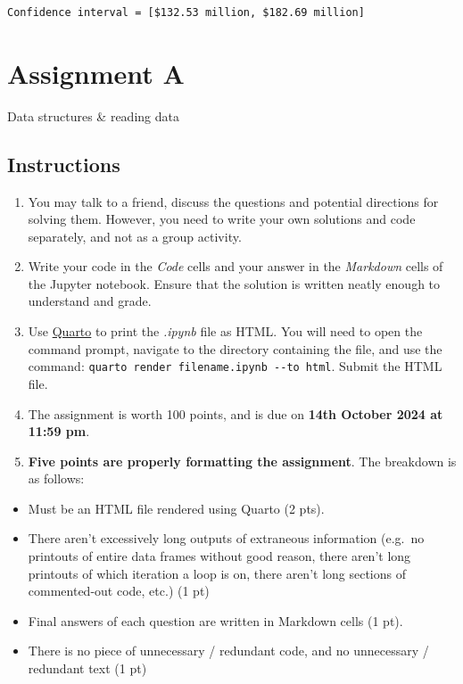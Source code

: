 \documentclass[
  letterpaper,
  DIV=11,
  numbers=noendperiod]{scrreprt}
\providecommand{\tightlist}{%
  \setlength{\itemsep}{0pt}\setlength{\parskip}{0pt}}\usepackage{longtable,booktabs,array}
\begin{document}
\begin{verbatim}
Confidence interval = [$132.53 million, $182.69 million]
\end{verbatim}

\cleardoublepage
{}
{}
\appendix

\hypertarget{assignment-a}{%
\chapter{Assignment A}\label{assignment-a}}

Data structures \& reading data

\hfill\break

\hypertarget{instructions-2}{%
\section*{Instructions}\label{instructions-2}}


\begin{enumerate}
\def\labelenumi{\arabic{enumi}.}
\item
  You may talk to a friend, discuss the questions and potential
  directions for solving them. However, you need to write your own
  solutions and code separately, and not as a group activity.
\item
  Write your code in the \emph{Code} cells and your answer in the
  \emph{Markdown} cells of the Jupyter notebook. Ensure that the
  solution is written neatly enough to understand and grade.
\item
  Use
  \href{https://quarto.org/docs/output-formats/html-basics.html}{Quarto}
  to print the \emph{.ipynb} file as HTML. You will need to open the
  command prompt, navigate to the directory containing the file, and use
  the command: \texttt{quarto\ render\ filename.ipynb\ -\/-to\ html}.
  Submit the HTML file.
\item
  The assignment is worth 100 points, and is due on \textbf{14th October
  2024 at 11:59 pm}.
\item
  \textbf{Five points are properly formatting the assignment}. The
  breakdown is as follows:
\end{enumerate}

\begin{itemize}
\tightlist
\item
  Must be an HTML file rendered using Quarto (2 pts).
\item
  There aren't excessively long outputs of extraneous information
  (e.g.~no printouts of entire data frames without good reason, there
  aren't long printouts of which iteration a loop is on, there aren't
  long sections of commented-out code, etc.) (1 pt)
\item
  Final answers of each question are written in Markdown cells (1 pt).
\item
  There is no piece of unnecessary / redundant code, and no unnecessary
  / redundant text (1 pt)
\end{itemize}
\end{document}

